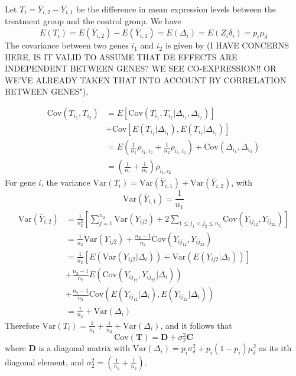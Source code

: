 \documentclass[useAMS,usenatbib, galley]{biom}
\begin{document}
	Let $T_i=\bar{Y}_{i,2}-\bar{Y}_{i,1}$ be the difference in mean expression levels between the treatment group and the control group. We have 
	\[E(T_i) = E(\bar{Y}_{i,2})-E(\bar{Y}_{i,1}) = E(\Delta_i) = E(Z_i\delta_i) = p_i\mu_{\delta}\]
	The covariance between two genes $i_1$ and $i_2$ is given by (I HAVE CONCERNS HERE, IS IT VALID TO ASSUME THAT DE EFFECTS ARE INDEPENDENT BETWEEN GENES?  WE SEE CO-EXPRESSION!! OR WE'VE ALREADY TAKEN THAT INTO ACCOUNT BY CORRELATION BETWEEN GENES"), 
	
	\begin{equation}
	\begin{aligned}
	\text{Cov}(T_{i_1}, T_{i_2}) & = E\left[\text{Cov}(T_{i_1}, T_{i_2}|\Delta_{i_1}, \Delta_{i_2}) \right] \\
	&  + \text{Cov}\left[E(T_{i_1}|\Delta_{i_1}), E(T_{i_2}|\Delta_{i_2})\right] \\
	& = E\left(\frac{1}{n_1}\rho_{i_1,i_2} + \frac{1}{n_2}\rho_{i_1,i_2}\right) + \text{Cov}(\Delta_{i_1}, \Delta_{i_2})\\
	& = \left(\frac{1}{n_1} + \frac{1}{n_2}\right)\rho_{i_1,i_2}
	\end{aligned}
	\end{equation}
	For gene $i$, the variance $\text{Var}(T_i) = \text{Var}(\bar{Y}_{i, 1}) + \text{Var}(\bar{Y}_{i, 2})$, with
	\[\text{Var}(\bar{Y}_{i, 1}) = \frac{1}{n_1}\] 
	\begin{equation}
	\begin{aligned}
	\text{Var}(\bar{Y}_{i, 2}) & = \frac{1}{n_2^2}\left[\sum_{j=1}^{n_2}\text{Var}(Y_{ij2}) + 2\sum_{1\leq j_1<j_2 \leq n_2} \text{Cov}(Y_{ij_12}, Y_{ij_22})\right] \\
	& = \frac{1}{n_2}\text{Var}(Y_{ij2}) + \frac{n_2-1}{n_2} \text{Cov}(Y_{ij_12}, Y_{ij_22})\\
	& = \frac{1}{n_2}\left[E\left(\text{Var}(Y_{ij2}|\Delta_i)\right) + \text{Var}\left(E(Y_{ij2}|\Delta_i)\right)\right] \\ \text{~~~} &+\frac{n_2-1}{n_2}E\left(\text{Cov}(Y_{ij_12}, Y_{ij_22}|\Delta_i)\right) \\ &+\frac{n_2-1}{n_2}\text{Cov}\left(E(Y_{ij_12}|\Delta_i), E(Y_{ij_22}|\Delta_i)\right) \\
	& = \frac{1}{n_2} + \text{Var}(\Delta_i)
	\end{aligned}
	\end{equation}
	Therefore $\text{Var}(T_i)  = \frac{1}{n_1} + \frac{1}{n_2} + \text{Var}(\Delta_i)$, and it follows that
	\begin{equation}\label{eq:tvar}
	\text{Cov}(\bm T) =  \bm D + \sigma_2^2\bm C 
	\end{equation}
	where $\bm D$ is a diagonal matrix with $\text{Var}(\Delta_i) =p_i\sigma_{\delta}^2 + p_i(1-p_i)\mu_{\delta}^2$ as its $i$th diagonal element, and $\sigma_2^2 = \left(\frac{1}{n_1} + \frac{1}{n_2}\right)$.
	
	
	
	
	
\end{document}
